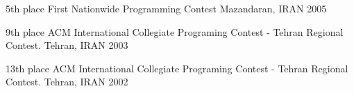 
\begin{cvhonors}
\cvhonor
  {5th place} %
  {First Nationwide Programming Contest} %
  {Mazandaran, IRAN} %
  {2005} %

\cvhonor
  {9th place} %
  {ACM International Collegiate Programing Contest - Tehran Regional Contest.} %
  {Tehran, IRAN} %
  {2003} %

\cvhonor
  {13th place} %
  {ACM International Collegiate Programing Contest - Tehran Regional Contest.} %
  {Tehran, IRAN} %
  {2002} %

\end{cvhonors}
